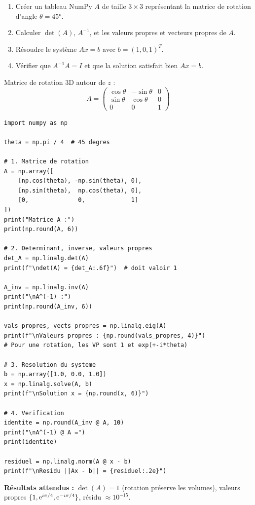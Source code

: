 \documentclass[12pt,a4paper]{article}
\begin{document}
\begin{boiteexercice}
\begin{enumerate}
  \item Créer un tableau NumPy $A$ de taille $3\times3$ représentant la matrice de rotation d'angle $\theta = 45°$.
  \item Calculer $\det(A)$, $A^{-1}$, et les valeurs propres et vecteurs propres de $A$.
  \item Résoudre le système $Ax = b$ avec $b = (1, 0, 1)^T$.
  \item Vérifier que $A^{-1}A = I$ et que la solution satisfait bien $Ax = b$.
\end{enumerate}
Matrice de rotation 3D autour de $z$ :
\[
A = \begin{pmatrix}\cos\theta & -\sin\theta & 0\\\sin\theta & \cos\theta & 0\\0 & 0 & 1\end{pmatrix}
\]
\end{boiteexercice}

\begin{boitecorrige}
\begin{lstlisting}
import numpy as np

theta = np.pi / 4  # 45 degres

# 1. Matrice de rotation
A = np.array([
    [np.cos(theta), -np.sin(theta), 0],
    [np.sin(theta),  np.cos(theta), 0],
    [0,              0,             1]
])
print("Matrice A :")
print(np.round(A, 6))

# 2. Determinant, inverse, valeurs propres
det_A = np.linalg.det(A)
print(f"\ndet(A) = {det_A:.6f}")  # doit valoir 1

A_inv = np.linalg.inv(A)
print("\nA^(-1) :")
print(np.round(A_inv, 6))

vals_propres, vects_propres = np.linalg.eig(A)
print(f"\nValeurs propres : {np.round(vals_propres, 4)}")
# Pour une rotation, les VP sont 1 et exp(+-i*theta)

# 3. Resolution du systeme
b = np.array([1.0, 0.0, 1.0])
x = np.linalg.solve(A, b)
print(f"\nSolution x = {np.round(x, 6)}")

# 4. Verification
identite = np.round(A_inv @ A, 10)
print("\nA^(-1) @ A =")
print(identite)

residuel = np.linalg.norm(A @ x - b)
print(f"\nResidu ||Ax - b|| = {residuel:.2e}")
\end{lstlisting}

\textbf{Résultats attendus :} $\det(A) = 1$ (rotation préserve les volumes), valeurs propres $\{1, \mathrm{e}^{i\pi/4}, \mathrm{e}^{-i\pi/4}\}$, résidu $\approx 10^{-15}$.
\end{boitecorrige}
\end{document}

